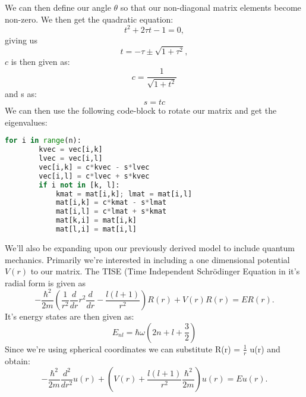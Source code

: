 \documentclass{article}
\begin{document}
We can then define our angle $\theta$ so that our non-diagonal matrix elements become non-zero. \newline
We then get the quadratic equation:
\begin{equation*}
    t^2+2\tau t-1= 0,
\end{equation*}
\newline giving us
\begin{equation*}
  t = -\tau \pm \sqrt{1+\tau^2},
\end{equation*}
\newline
$c$ is then given as:
\begin{equation}
    c = \frac{1}{\sqrt{1+t^2}}
\end{equation}
and s as:
\begin{equation}
    s = tc
\end{equation}
We can then use the following code-block to rotate our matrix and get the eigenvalues:
\begin{lstlisting}[language=Python]
for i in range(n):
        kvec = vec[i,k]
        lvec = vec[i,l]
        vec[i,k] = c*kvec - s*lvec
        vec[i,l] = c*lvec + s*kvec
        if i not in [k, l]:
            kmat = mat[i,k]; lmat = mat[i,l]
            mat[i,k] = c*kmat - s*lmat
            mat[i,l] = c*lmat + s*kmat
            mat[k,i] = mat[i,k]
            mat[l,i] = mat[i,l]
\end{lstlisting} \newline
We'll also be expanding upon our previously derived model to include quantum mechanics. \newline
Primarily we're interested in including a one dimensional potential $V(r)$ to our matrix. The TISE (Time Independent Schrödinger Equation in it's radial form is given as
\begin{equation}
    -\frac{\hbar^2}{2 m} \left ( \frac{1}{r^2} \frac{d}{dr} r^2
  \frac{d}{dr} - \frac{l (l + 1)}{r^2} \right )R(r) 
     + V(r) R(r) = E R(r).
\end{equation}
It's energy states are then given as:
\begin{equation}
    E_{nl}=  \hbar \omega \left(2n+l+\frac{3}{2}\right)
\end{equation}
Since we're using spherical coordinates we can substitute R(r) = $\frac{1}{r}$ u(r) and obtain:
\begin{equation*}
  -\frac{\hbar^2}{2 m} \frac{d^2}{dr^2} u(r) 
       + \left ( V(r) + \frac{l (l + 1)}{r^2}\frac{\hbar^2}{2 m}
                                    \right ) u(r)  = E u(r) .
\end{equation*}
\end{document}

